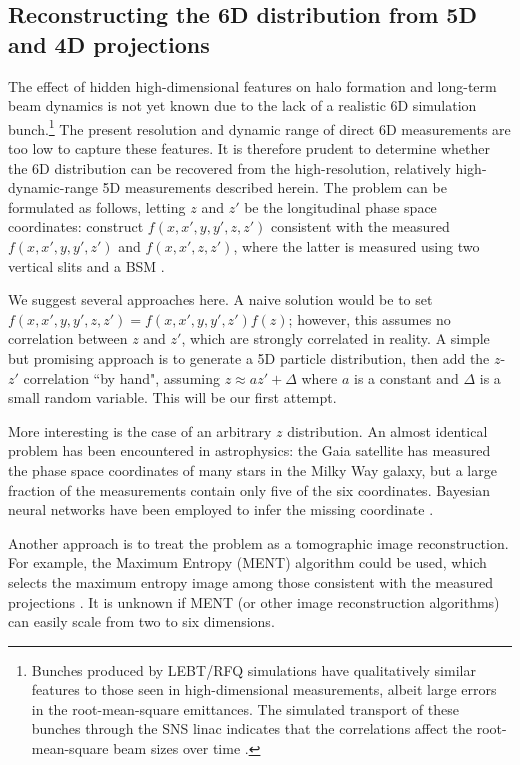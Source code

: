 \documentclass[letterpaper,
               keeplastbox,
               nospread,
               biblatex,
              ]{jacow}
\begin{document}
\subsection{Reconstructing the 6D distribution from 5D and 4D projections}

The effect of hidden high-dimensional features on halo formation and long-term beam dynamics is not yet known due to the lack of a realistic 6D simulation bunch.\footnote{
   Bunches produced by LEBT/RFQ simulations have qualitatively similar features to those seen in high-dimensional measurements, albeit large errors in the root-mean-square emittances. The simulated transport of these bunches through the SNS linac indicates that the correlations affect the root-mean-square beam sizes over time \cite{Ruisard2021-IPAC}.
} The present resolution and dynamic range of direct 6D measurements are too low to capture these features. It is therefore prudent to determine whether the 6D distribution can be recovered from the high-resolution, relatively high-dynamic-range 5D measurements described herein. The problem can be formulated as follows, letting $z$ and $z'$ be the longitudinal phase space coordinates: construct $f(x, x', y, y', z, z')$ consistent with the measured $f(x, x', y, y', z')$ and $f(x, x', z, z')$, where the latter is measured using two vertical slits and a BSM \cite{Ruisard2021-long}. 

We suggest several approaches here. A naive solution would be to set $f(x, x', y, y', z, z') = f(x, x', y, y', z') f(z)$; however, this assumes no correlation between $z$ and $z'$, which are strongly correlated in reality. A simple but promising approach is to generate a 5D particle distribution, then add the $z$-$z'$ correlation ``by hand", assuming $z \approx az' + \Delta$ where $a$ is a constant and $\Delta$ is a small random variable. This will be our first attempt.

More interesting is the case of an arbitrary $z$ distribution. An almost identical problem has been encountered in astrophysics: the Gaia satellite has measured the phase space coordinates of many stars in the Milky Way galaxy, but a large fraction of the measurements contain only five of the six coordinates. Bayesian neural networks have been employed to infer the missing coordinate \cite{}. 

Another approach is to treat the problem as a tomographic image reconstruction. For example, the Maximum Entropy (MENT) algorithm could be used, which selects the maximum entropy image among those consistent with the measured projections \cite{}. It is unknown if MENT (or other image reconstruction algorithms) can easily scale from two to six dimensions.
\end{document}
